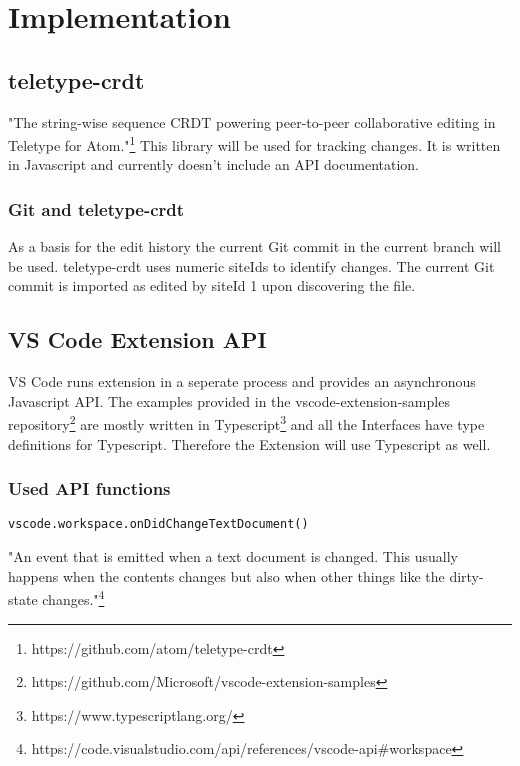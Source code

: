 \chapter{Implementation}

\section{teletype-crdt}

"The string-wise sequence CRDT powering peer-to-peer collaborative editing in Teletype for Atom."\footnote{https://github.com/atom/teletype-crdt}
This library will be used for tracking changes. It is written in Javascript and currently doesn't include an API documentation.

\subsection{Git and teletype-crdt}
As a basis for the edit history  the current Git commit in the current branch will be used. teletype-crdt uses numeric siteIds to identify changes. The current Git commit is imported as edited by siteId 1 upon discovering the file.

\section{VS Code Extension API}

VS Code runs extension in a seperate process and provides an asynchronous Javascript API.
The examples provided in the vscode-extension-samples repository\footnote{https://github.com/Microsoft/vscode-extension-samples} are mostly written in Typescript\footnote{https://www.typescriptlang.org/} and all the Interfaces have type definitions for Typescript.
Therefore the Extension will use Typescript as well.

\subsection{Used API functions}

\begin{lstlisting}
vscode.workspace.onDidChangeTextDocument()
\end{lstlisting}

"An event that is emitted when a text document is changed. This usually happens when the contents changes but also when other things like the dirty-state changes."\footnote{https://code.visualstudio.com/api/references/vscode-api\#workspace}

